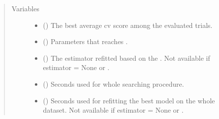 \documentclass[letterpaper,10pt,english]{sphinxmanual}
\begin{document}
\begin{fulllineitems}
\begin{sphinxVerbatim}[commandchars=\\\{\}]
 
\end{sphinxVerbatim}
\begin{quote}\begin{description}
\item[{Variables}] \leavevmode\begin{itemize}
\item {} 
 () \textendash{} The best average cv score among the evaluated trials.

\item {} 
 () \textendash{} Parameters that reaches .

\item {} 
 () \textendash{} The estimator refitted based on the . 
Not available if estimator = None or .

\item {} 
 () \textendash{} Seconds used for whole searching procedure.

\item {} 
 () \textendash{} Seconds used for refitting the best model on the whole dataset.
Not available if estimator = None or .

\end{itemize}

\end{description}\end{quote}


\end{fulllineitems}
\end{document}
